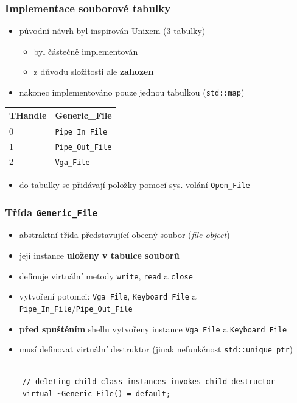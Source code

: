 \documentclass[xcolor=dvipsnames]{beamer}
\begin{document}
\begin{frame}[fragile]
\frametitle{Implementace souborové tabulky}
    \begin{itemize}
        \item původní návrh byl inspirován Unixem (3 tabulky)
        \begin{itemize}
            \item byl částečně implementován
            \item z důvodu složitosti ale \textbf{zahozen}
        \end{itemize}
        \item nakonec implementováno pouze jednou tabulkou (\texttt{std::map})
    \end{itemize}
    \begin{table}[]
    \begin{tabular}{|l|l|}
        \hline
        \textbf{THandle} & \textbf{Generic\_File}   \\ \hline \hline
        0       & \texttt{Pipe\_In\_File}  \\ \hline
        1       & \texttt{Pipe\_Out\_File} \\ \hline
        2       & \texttt{Vga\_File}       \\ \hline
    \end{tabular}
    \end{table}       
    \begin{itemize}
        \item do tabulky se přidávají položky pomocí sys. volání \texttt{Open\_File}
    \end{itemize}
\end{frame}

\begin{frame}[fragile]
\frametitle{Třída \texttt{Generic\_File}}
    \begin{itemize}
        \item abstraktní třída představující obecný soubor (\textit{file object})
        \item její instance \textbf{uloženy v tabulce souborů}
        \item definuje virtuální metody \texttt{write}, \texttt{read} a \texttt{close} 
        \item vytvoření potomci: \texttt{Vga\_File}, \texttt{Keyboard\_File} a \texttt{Pipe\_In\_File}/\texttt{Pipe\_Out\_File}
        \item \textbf{před spuštěním} shellu vytvořeny instance \texttt{Vga\_File} a \texttt{Keyboard\_File}
        \item musí definovat virtuální destruktor (jinak nefunkčnost \texttt{std::unique\_ptr})
    \end{itemize}
        \begingroup
        \small
        \begin{verbatim}        
   
    // deleting child class instances invokes child destructor
    virtual ~Generic_File() = default;
        \end{verbatim}
       \endgroup
\end{frame}
\end{document}
